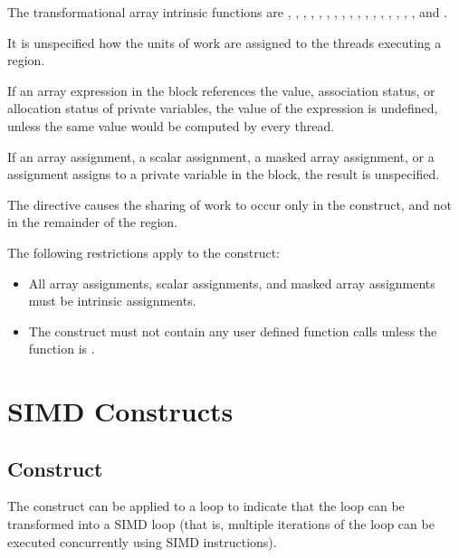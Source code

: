 The transformational array intrinsic functions are , , , 
, , , , 
, , , , , 
, , , , , and .

It is unspecified how the units of work are assigned to the threads executing a 
 region.

If an array expression in the block references the value, association status, or allocation 
status of private variables, the value of the expression is undefined, unless the same 
value would be computed by every thread.

If an array assignment, a scalar assignment, a masked array assignment, or a  
assignment assigns to a private variable in the block, the result is unspecified.

The  directive causes the sharing of work to occur only in the  
construct, and not in the remainder of the  region.

\begin{samepage}
\restrictions
The following restrictions apply to the  construct:

\begin{itemize}
\item All array assignments, scalar assignments, and masked array assignments must be 
intrinsic assignments.

\item The construct must not contain any user defined function calls unless the function is 
.
\end{itemize}
\fortranspecificend
\end{samepage}













\filbreak
\section{SIMD Constructs}
\label{sec:SIMD Constructs}
\subsection{ Construct}
\label{subsec:simd Construct}
\summary
The  construct can be applied to a loop to indicate that the loop can be transformed 
into a SIMD loop (that is, multiple iterations of the loop can be executed concurrently 
using SIMD instructions).

